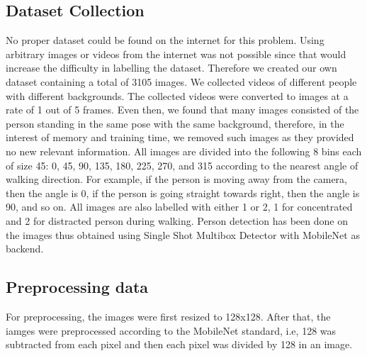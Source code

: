 \documentclass[extendedabs]{bmvc2k}
\begin{document}
\subsection{Dataset Collection}
No proper dataset could be found on the internet for this problem. Using arbitrary images or videos from the internet was not possible since that would increase the difficulty in labelling the dataset. Therefore we created our own dataset containing a total of 3105 images. We collected videos of different people with different backgrounds. The collected videos were converted to images at a rate of 1 out of 5 frames. Even then, we found that many images consisted of the person standing in the same pose with the same background, therefore, in the interest of memory and training time, we removed such images as they provided no new relevant information. All images are divided into the following 8 bins each of size 45: 0, 45, 90, 135, 180, 225, 270, and 315 according to the nearest angle of walking direction. For example, if the person is moving away from the camera, then the angle is 0, if the person is going straight towards right, then the angle is 90, and so on. All images are also labelled with either 1 or 2, 1 for concentrated and 2 for distracted person during walking. Person detection has been done on the images thus obtained using Single Shot Multibox Detector \cite{liu2016ssd} with MobileNet \cite{howard2017mobilenets} as backend.

\subsection{Preprocessing data}
For preprocessing, the images were first resized to 128x128. After that, the iamges were preprocessed according to the MobileNet standard, i.e, 128 was subtracted from each pixel and then each pixel was divided by 128 in an image.
\end{document}
